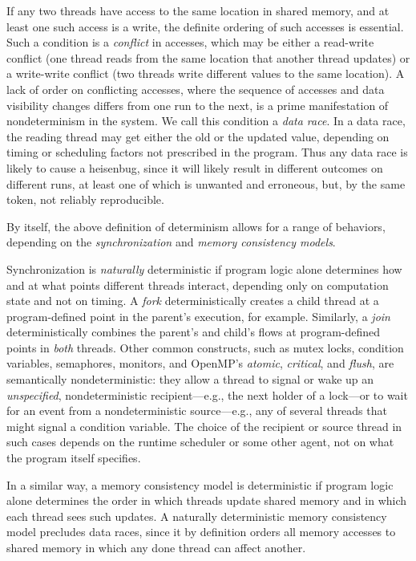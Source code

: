 If any two threads have access to the same location in shared memory, and at least one such access is a write, the definite ordering of such accesses is essential.  Such a condition is a \textit{conflict} in accesses, which may be either a read-write conflict (one thread reads from the same location that another thread updates) or a write-write conflict (two threads write different values to the same location).  A lack of order on conflicting accesses, where the sequence of accesses and data visibility changes differs from one run to the next, is a prime manifestation of nondeterminism in the system.  We call this condition a \textit{data race}.  In a data race, the reading thread may get either the old or the updated value, depending on timing or scheduling factors not prescribed in the program.  Thus any data race is likely to cause a heisenbug, since it will likely result in different outcomes on different runs, at least one of which is unwanted and erroneous, but, by the same token, not reliably reproducible.    

By itself, the above definition of determinism allows for a range of behaviors, depending on the \textit{synchronization} and \textit{memory consistency models}.  

Synchronization is \textit{naturally} deterministic if program logic alone determines how and at what points different threads interact, depending only on computation state and not on timing.  
A \textit{fork} deterministically creates a child thread at a program-defined point in the parent's execution, for example.  Similarly, a \textit{join} deterministically combines the parent's and child's flows at program-defined points in {\em both} threads.  Other common constructs, such as mutex locks, condition variables, semaphores, monitors, and OpenMP's \textit{atomic}, \textit{critical}, and \textit{flush}, are semantically nondeterministic: they allow a thread to signal or wake up an {\em unspecified}, nondeterministic recipient---e.g., the next holder of a lock---or to wait for an event from a nondeterministic source---e.g., any of several threads that might signal a condition variable.  The choice of the recipient or source thread in such cases depends on the runtime scheduler or some other agent, not on what the program itself specifies.

In a similar way, a memory consistency model is deterministic if program logic alone determines the order in which threads update shared memory and in which each thread sees such updates.   A naturally deterministic memory consistency model precludes data races, since it by definition orders all memory accesses to shared memory in which any done thread can affect another.


